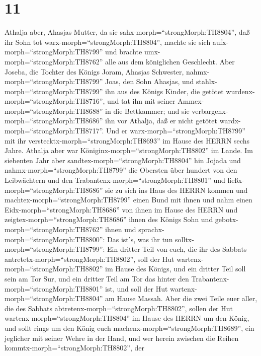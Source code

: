 \hypertarget{section-10}{%
\section{11}\label{section-10}}

 Athalja aber, Ahasjas Mutter, da sie
sahx-morph=``strongMorph:TH8804'', daß ihr Sohn tot
warx-morph=``strongMorph:TH8804'', machte sie sich
aufx-morph=``strongMorph:TH8799'' und brachte
umx-morph=``strongMorph:TH8762'' alle aus dem königlichen Geschlecht.
 Aber Joseba, die Tochter des Königs Joram, Ahasjas
Schwester, nahmx-morph=``strongMorph:TH8799'' Joas, den Sohn Ahasjas,
und stahlx-morph=``strongMorph:TH8799'' ihn aus des Königs Kinder, die
getötet wurdenx-morph=``strongMorph:TH8716'', und tat ihn mit seiner
Ammex-morph=``strongMorph:TH8688'' in die Bettkammer; und sie
verbargenx-morph=``strongMorph:TH8686'' ihn vor Athalja, daß er nicht
getötet wardx-morph=``strongMorph:TH8717''.  Und er
warx-morph=``strongMorph:TH8799'' mit ihr
verstecktx-morph=``strongMorph:TH8693'' im Hause des HERRN sechs Jahre.
Athalja aber war Königinx-morph=``strongMorph:TH8802'' im Lande.
 Im siebenten Jahr aber sandtex-morph=``strongMorph:TH8804''
hin Jojada und nahmx-morph=``strongMorph:TH8799'' die Obersten über
hundert von den Leibwächtern und den
Trabantenx-morph=``strongMorph:TH8801'' und
ließx-morph=``strongMorph:TH8686'' sie zu sich ins Haus des HERRN kommen
und machtex-morph=``strongMorph:TH8799'' einen Bund mit ihnen und nahm
einen Eidx-morph=``strongMorph:TH8686'' von ihnen im Hause des HERRN und
zeigtex-morph=``strongMorph:TH8686'' ihnen des Königs Sohn 
und gebotx-morph=``strongMorph:TH8762'' ihnen und
sprachx-morph=``strongMorph:TH8800'': Das ist's, was ihr tun
solltx-morph=``strongMorph:TH8799'': Ein dritter Teil von euch, die ihr
des Sabbats antretetx-morph=``strongMorph:TH8802'', soll der Hut
wartenx-morph=``strongMorph:TH8802'' im Hause des Königs, 
und ein dritter Teil soll sein am Tor Sur, und ein dritter Teil am Tor
das hinter den Trabantenx-morph=``strongMorph:TH8801'' ist, und soll der
Hut wartenx-morph=``strongMorph:TH8804'' am Hause Massah. 
Aber die zwei Teile euer aller, die des Sabbats
abtretenx-morph=``strongMorph:TH8802'', sollen der Hut
wartenx-morph=``strongMorph:TH8804'' im Hause des HERRN um den König,
 und sollt rings um den König euch
machenx-morph=``strongMorph:TH8689'', ein jeglicher mit seiner Wehre in
der Hand, und wer herein zwischen die Reihen
kommtx-morph=``strongMorph:TH8802'', der
